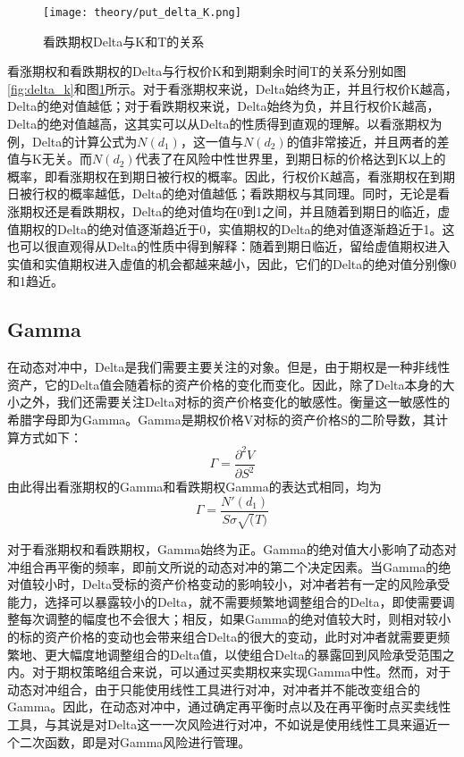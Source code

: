 \begin{figure}[htb]
  \centering
  \texttt{[image: theory/put\_delta\_K.png]}
  \caption[这里将出现在插图索引中]
    {看跌期权Delta与K和T的关系}
  \label{fig:put_delta_k}
\end{figure}

看涨期权和看跌期权的Delta与行权价K和到期剩余时间T的关系分别如图\ref{fig:delta_k}和图\ref{fig:put_delta_k}所示。对于看涨期权来说，Delta始终为正，并且行权价K越高，Delta的绝对值越低；对于看跌期权来说，Delta始终为负，并且行权价K越高，Delta的绝对值越高，这其实可以从Delta的性质得到直观的理解。以看涨期权为例，Delta的计算公式为$N(d_1)$，这一值与$N(d_2)$的值非常接近，并且两者的差值与K无关。而$N(d_2)$代表了在风险中性世界里，到期日标的价格达到K以上的概率，即看涨期权在到期日被行权的概率。因此，行权价K越高，看涨期权在到期日被行权的概率越低，Delta的绝对值越低；看跌期权与其同理。同时，无论是看涨期权还是看跌期权，Delta的绝对值均在0到1之间，并且随着到期日的临近，虚值期权的Delta的绝对值逐渐趋近于0，实值期权的Delta的绝对值逐渐趋近于1。这也可以很直观得从Delta的性质中得到解释：随着到期日临近，留给虚值期权进入实值和实值期权进入虚值的机会都越来越小，因此，它们的Delta的绝对值分别像0和1趋近。

\subsection{Gamma}

在动态对冲中，Delta是我们需要主要关注的对象。但是，由于期权是一种非线性资产，它的Delta值会随着标的资产价格的变化而变化。因此，除了Delta本身的大小之外，我们还需要关注Delta对标的资产价格变化的敏感性。衡量这一敏感性的希腊字母即为Gamma。Gamma是期权价格V对标的资产价格S的二阶导数，其计算方式如下：
\begin{equation}
  \Gamma=\frac{\partial^2 V}{\partial S^2}
\end{equation}
由此得出看涨期权的Gamma和看跌期权Gamma的表达式相同，均为
\begin{equation}
  \Gamma=\frac{N'(d_1)}{S\sigma\sqrt(T)}
\end{equation}

对于看涨期权和看跌期权，Gamma始终为正。Gamma的绝对值大小影响了动态对冲组合再平衡的频率，即前文所说的动态对冲的第二个决定因素。当Gamma的绝对值较小时，Delta受标的资产价格变动的影响较小，对冲者若有一定的风险承受能力，选择可以暴露较小的Delta，就不需要频繁地调整组合的Delta，即使需要调整每次调整的幅度也不会很大；相反，如果Gamma的绝对值较大时，则相对较小的标的资产价格的变动也会带来组合Delta的很大的变动，此时对冲者就需要更频繁地、更大幅度地调整组合的Delta值，以使组合Delta的暴露回到风险承受范围之内。对于期权策略组合来说，可以通过买卖期权来实现Gamma中性。然而，对于动态对冲组合，由于只能使用线性工具进行对冲，对冲者并不能改变组合的Gamma。因此，在动态对冲中，通过确定再平衡时点以及在再平衡时点买卖线性工具，与其说是对Delta这一一次风险进行对冲，不如说是使用线性工具来逼近一个二次函数，即是对Gamma风险进行管理。

